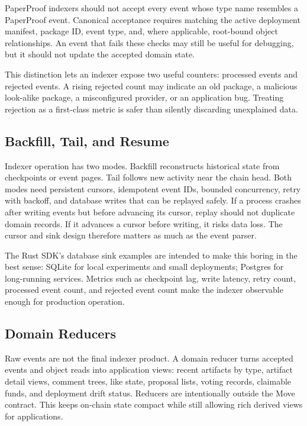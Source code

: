 \documentclass[journal]{IEEEtran}
\begin{document}
PaperProof indexers should not accept every event whose type name resembles a PaperProof event. Canonical acceptance requires matching the active deployment manifest, package ID, event type, and, where applicable, root-bound object relationships. An event that fails these checks may still be useful for debugging, but it should not update the accepted domain state.

This distinction lets an indexer expose two useful counters: processed events and rejected events. A rising rejected count may indicate an old package, a malicious look-alike package, a misconfigured provider, or an application bug. Treating rejection as a first-class metric is safer than silently discarding unexplained data.

\subsection{Backfill, Tail, and Resume}

Indexer operation has two modes. Backfill reconstructs historical state from checkpoints or event pages. Tail follows new activity near the chain head. Both modes need persistent cursors, idempotent event IDs, bounded concurrency, retry with backoff, and database writes that can be replayed safely. If a process crashes after writing events but before advancing its cursor, replay should not duplicate domain records. If it advances a cursor before writing, it risks data loss. The cursor and sink design therefore matters as much as the event parser.

The Rust SDK's database sink examples are intended to make this boring in the best sense: SQLite for local experiments and small deployments; Postgres for long-running services. Metrics such as checkpoint lag, write latency, retry count, processed event count, and rejected event count make the indexer observable enough for production operation.

\subsection{Domain Reducers}

Raw events are not the final indexer product. A domain reducer turns accepted events and object reads into application views: recent artifacts by type, artifact detail views, comment trees, like state, proposal lists, voting records, claimable funds, and deployment drift status. Reducers are intentionally outside the Move contract. This keeps on-chain state compact while still allowing rich derived views for applications.
\end{document}
